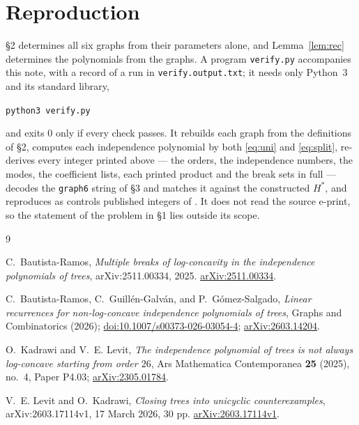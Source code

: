 \documentclass[11pt]{amsart}
\theoremstyle{definition}
\theoremstyle{remark}
\begin{document}
\section{Reproduction}

\S2 determines all six graphs from their parameters alone, and Lemma~\ref{lem:rec}
determines the polynomials from the graphs. A program \texttt{verify.py}
accompanies this note, with a record of a run in
\texttt{verify.output.txt}; it needs only Python~3 and its standard library,
\begin{center}\texttt{python3 verify.py}\end{center}
and exits $0$ only if every check passes. It rebuilds each graph from the definitions
of \S2, computes each independence polynomial by both \eqref{eq:uni} and
\eqref{eq:split}, re-derives every integer printed above --- the orders, the
independence numbers, the modes, the coefficient lists, each printed product and the
break sets in full --- decodes the \texttt{graph6} string of \S3 and matches it against
the constructed $H^*$, and reproduces as controls published integers of
\cite{BautistaRamos,BRGG,KadrawiLevit}. It does not read the source e-print, so the
statement of the problem in \S1 lies outside its scope.

\begin{thebibliography}{9}

C.~Bautista-Ramos,
\emph{Multiple breaks of log-concavity in the independence polynomials of trees},
arXiv:2511.00334, 2025.
\href{https://arxiv.org/abs/2511.00334}{arXiv:2511.00334}.

C.~Bautista-Ramos, C.~Guill\'en-Galv\'an, and P.~G\'omez-Salgado,
\emph{Linear recurrences for non-log-concave independence polynomials of trees},
Graphs and Combinatorics (2026);
\href{https://doi.org/10.1007/s00373-026-03054-4}{doi:10.1007/s00373-026-03054-4};
\href{https://arxiv.org/abs/2603.14204}{arXiv:2603.14204}.

O.~Kadrawi and V.~E. Levit,
\emph{The independence polynomial of trees is not always log-concave starting from
order $26$},
Ars Mathematica Contemporanea \textbf{25} (2025), no.~4, Paper P4.03;
\href{https://arxiv.org/abs/2305.01784}{arXiv:2305.01784}.

V.~E. Levit and O.~Kadrawi,
\emph{Closing trees into unicyclic counterexamples},
arXiv:2603.17114v1, 17 March 2026, 30 pp.
\href{https://arxiv.org/abs/2603.17114v1}{arXiv:2603.17114v1}.

\end{thebibliography}
\end{document}
